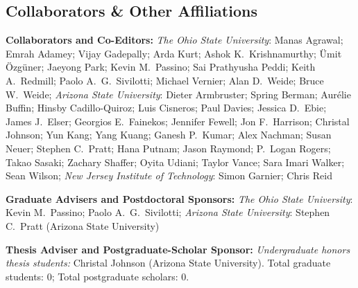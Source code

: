 \documentclass[a4paper,11pt]{article}
\begin{document}
\subsection{Collaborators \& Other Affiliations}

\begin{bibsection}

    \item \textbf{Collaborators and Co-Editors:}
        \emph{The Ohio State University}:
            Manas Agrawal;
            Emrah Adamey;
            Vijay Gadepally;
            Arda Kurt;
            Ashok K.~Krishnamurthy;
            \"{U}mit \"{O}zg\"{u}ner;
            Jaeyong Park;
            Kevin M.~Passino;
            Sai Prathyusha Peddi;
            Keith A.~Redmill;
            Paolo A.~G.~Sivilotti;
            Michael Vernier;
            Alan D.~Weide;
            Bruce W.~Weide;
        \emph{Arizona State University}:
            Dieter Armbruster;
            Spring Berman;
            Aur{\'{e}}lie Buffin;
            Hinsby Cadillo-Quiroz;
            Luis Cisneros;
            Paul Davies;
            Jessica D.~Ebie;
            James J.~Elser;
            Georgios E.~Fainekos;
            Jennifer Fewell;
            Jon F.~Harrison;
            Christal Johnson;
            Yun Kang;
            Yang Kuang;
            Ganesh P.~Kumar;
            Alex Nachman;
            Susan Neuer;
            Stephen C.~Pratt;
            Hana Putnam;
            Jason Raymond;
            P.~Logan Rogers;
            Takao Sasaki;
            Zachary Shaffer;
            Oyita Udiani;
            Taylor Vance;
            Sara Imari Walker;
            Sean Wilson;
        \emph{New Jersey Institute of Technology}:
            Simon Garnier;
            Chris Reid

    \item \textbf{Graduate Advisers and Postdoctoral Sponsors:}
        \emph{The Ohio State University}:
            Kevin M.~Passino;
            Paolo A.~G.~Sivilotti;
        \emph{Arizona State University}:
            Stephen C.~Pratt (Arizona State University)

    \item \textbf{Thesis Adviser and Postgraduate-Scholar Sponsor:}
        \emph{Undergraduate honors thesis students:}
            Christal Johnson (Arizona State University).
        Total graduate students: 0; Total postgraduate scholars: 0.


\end{bibsection}
\end{document}
